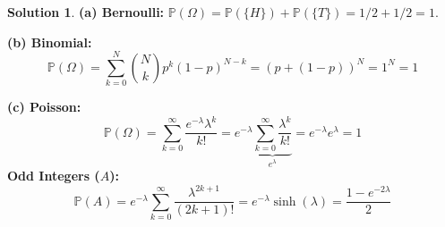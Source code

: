 \documentclass[11pt]{article}
\theoremstyle{definition}
\newtheorem*{solution}{Solution}
\begin{document}
\begin{solution}
\textbf{(a) Bernoulli:}
$\mathbb{P}(\Omega) = \mathbb{P}(\{H\}) + \mathbb{P}(\{T\}) = 1/2 + 1/2 = 1$.

\textbf{(b) Binomial:}
\[ \mathbb{P}(\Omega) = \sum_{k=0}^N \binom{N}{k} p^k (1-p)^{N-k} = (p + (1-p))^N = 1^N = 1 \]

\textbf{(c) Poisson:}
\[ \mathbb{P}(\Omega) = \sum_{k=0}^\infty \frac{e^{-\lambda} \lambda^k}{k!} = e^{-\lambda} \underbrace{\sum_{k=0}^\infty \frac{\lambda^k}{k!}}_{e^\lambda} = e^{-\lambda} e^\lambda = 1 \]
\textbf{Odd Integers ($A$):}
\[ \mathbb{P}(A) = e^{-\lambda} \sum_{k=0}^\infty \frac{\lambda^{2k+1}}{(2k+1)!} = e^{-\lambda} \sinh(\lambda) = \frac{1 - e^{-2\lambda}}{2} \]
\end{solution}
\end{document}
